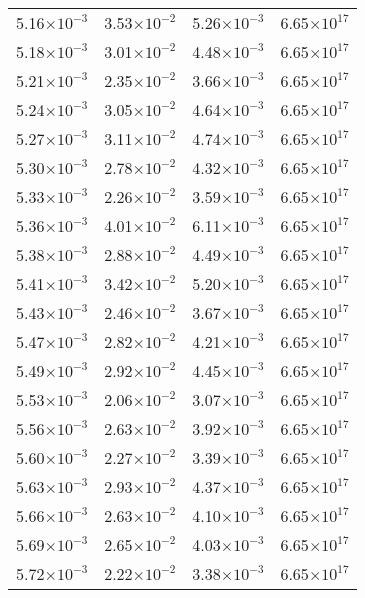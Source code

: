 \documentclass{aa}
\begin{document}
{\begin{longtable}{c|c|c|c}
5.16$\times 10^{-3}$ & 3.53$\times 10^{-2}$ & 5.26$\times 10^{-3}$ & 6.65$\times 10^{17}$  \\
5.18$\times 10^{-3}$ & 3.01$\times 10^{-2}$ & 4.48$\times 10^{-3}$ & 6.65$\times 10^{17}$  \\
5.21$\times 10^{-3}$ & 2.35$\times 10^{-2}$ & 3.66$\times 10^{-3}$ & 6.65$\times 10^{17}$  \\
5.24$\times 10^{-3}$ & 3.05$\times 10^{-2}$ & 4.64$\times 10^{-3}$ & 6.65$\times 10^{17}$  \\
5.27$\times 10^{-3}$ & 3.11$\times 10^{-2}$ & 4.74$\times 10^{-3}$ & 6.65$\times 10^{17}$  \\
5.30$\times 10^{-3}$ & 2.78$\times 10^{-2}$ & 4.32$\times 10^{-3}$ & 6.65$\times 10^{17}$  \\
5.33$\times 10^{-3}$ & 2.26$\times 10^{-2}$ & 3.59$\times 10^{-3}$ & 6.65$\times 10^{17}$  \\
5.36$\times 10^{-3}$ & 4.01$\times 10^{-2}$ & 6.11$\times 10^{-3}$ & 6.65$\times 10^{17}$  \\
5.38$\times 10^{-3}$ & 2.88$\times 10^{-2}$ & 4.49$\times 10^{-3}$ & 6.65$\times 10^{17}$  \\
5.41$\times 10^{-3}$ & 3.42$\times 10^{-2}$ & 5.20$\times 10^{-3}$ & 6.65$\times 10^{17}$  \\
5.43$\times 10^{-3}$ & 2.46$\times 10^{-2}$ & 3.67$\times 10^{-3}$ & 6.65$\times 10^{17}$  \\
5.47$\times 10^{-3}$ & 2.82$\times 10^{-2}$ & 4.21$\times 10^{-3}$ & 6.65$\times 10^{17}$  \\
5.49$\times 10^{-3}$ & 2.92$\times 10^{-2}$ & 4.45$\times 10^{-3}$ & 6.65$\times 10^{17}$  \\
5.53$\times 10^{-3}$ & 2.06$\times 10^{-2}$ & 3.07$\times 10^{-3}$ & 6.65$\times 10^{17}$  \\
5.56$\times 10^{-3}$ & 2.63$\times 10^{-2}$ & 3.92$\times 10^{-3}$ & 6.65$\times 10^{17}$  \\
5.60$\times 10^{-3}$ & 2.27$\times 10^{-2}$ & 3.39$\times 10^{-3}$ & 6.65$\times 10^{17}$  \\
5.63$\times 10^{-3}$ & 2.93$\times 10^{-2}$ & 4.37$\times 10^{-3}$ & 6.65$\times 10^{17}$  \\
5.66$\times 10^{-3}$ & 2.63$\times 10^{-2}$ & 4.10$\times 10^{-3}$ & 6.65$\times 10^{17}$  \\
5.69$\times 10^{-3}$ & 2.65$\times 10^{-2}$ & 4.03$\times 10^{-3}$ & 6.65$\times 10^{17}$  \\
5.72$\times 10^{-3}$ & 2.22$\times 10^{-2}$ & 3.38$\times 10^{-3}$ & 6.65$\times 10^{17}$  \\

\end{longtable}}
\end{document}

